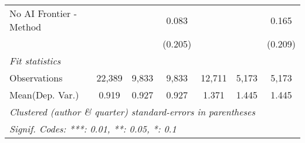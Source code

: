 \begin{tabular}{lcccccc}
   No AI Frontier - Method &               &               & 0.083        &               &             & 0.165\\   
                           &               &               & (0.205)      &               &             & (0.209)\\   
   \midrule
   \emph{Fit statistics}\\
   Observations            & 22,389        & 9,833         & 9,833        & 12,711        & 5,173       & 5,173\\  
Mean(Dep. Var.) & 0.919 & 0.927 & 0.927 & 1.371 & 1.445 & 1.445 \\
   \midrule \midrule
   \multicolumn{7}{l}{\emph{Clustered (author \& quarter) standard-errors in parentheses}}\\
   \multicolumn{7}{l}{\emph{Signif. Codes: ***: 0.01, **: 0.05, *: 0.1}}\\
\end{tabular}
\par\endgroup
